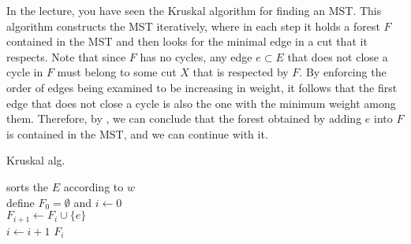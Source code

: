 In the lecture, you have seen the Kruskal algorithm for finding an MST. This algorithm constructs the MST iteratively, where in each step it holds a forest $F$ contained in the MST and then looks for the minimal edge in a cut that it respects. Note that since $F$ has no cycles, any edge $e \subset E$ that does not close a cycle in $F$ must belong to some cut $X$ that is respected by $F$. By enforcing the order of edges being examined to be increasing in weight, it follows that the first edge that does not close a cycle is also the one with the minimum weight among them. Therefore, by , we can conclude that the forest obtained by adding $e$ into $F$ is contained in the MST, and we can continue with it.

\begin{algorithm}
\SetAlgoLined
{}
\caption{ Kruskal alg.}
sorts the $E$ according to $w$ \\
define $F_{0} = \emptyset$ and $i \leftarrow 0$ \\
 {
   {
    $F_{i+1} \leftarrow F_{i} \cup \{e\}$ \\
    $i \leftarrow i + 1$
  }
}
\Return $F_{i}$
\end{algorithm}




